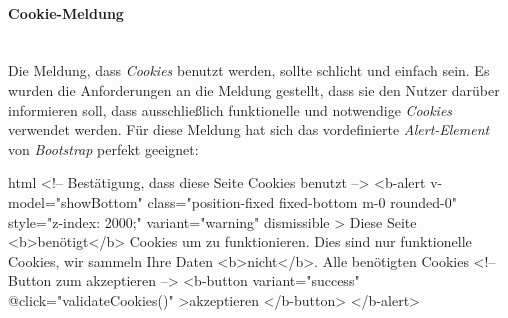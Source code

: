 \paragraph{Cookie-Meldung}
~\\
Die Meldung, dass \textit{Cookies} benutzt werden, sollte schlicht und einfach sein. Es wurden die Anforderungen an die Meldung gestellt, dass sie den Nutzer darüber informieren soll, dass ausschließlich funktionelle und notwendige \textit{Cookies} verwendet werden. Für diese Meldung hat sich das vordefinierte \textit{Alert-Element} von \textit{Bootstrap} perfekt geeignet:
\makeatletter
\begin{code}{html}
	<!-- Bestätigung, dass diese Seite Cookies benutzt -->
	<b-alert
		v-model="showBottom"
		class="position-fixed fixed-bottom m-0 rounded-0"
		style="z-index: 2000;"
		variant="warning"
		dismissible
	>
		Diese Seite <b>benötigt</b> Cookies um zu funktionieren. Dies sind nur
		funktionelle Cookies, wir sammeln Ihre Daten <b>nicht</b>. Alle benötigten
		Cookies
		<!-- Button zum akzeptieren -->
		<b-button variant="success" @click="validateCookies()"
			>akzeptieren
		</b-button>
	</b-alert>
\end{code}
\makeatother
{}
	\label{list:cookiehtml} ~\\
\newpage
